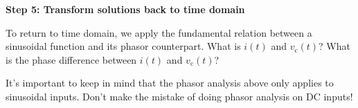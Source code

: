 \begin{enumerate}

\qitem \textbf{Step 5: Transform solutions back to time domain}

To return to time domain, we apply the fundamental relation between a sinusoidal function and its phasor counterpart.
What is $i(t)$ and $v_{\text{c}}(t)$? What is the phase difference between $i(t)$ and $v_{\text{c}}(t)$? 



\end{enumerate}

It's important to keep in mind that the phasor analysis above only applies to
sinusoidal inputs. Don't make the mistake of doing phasor analysis on DC inputs!